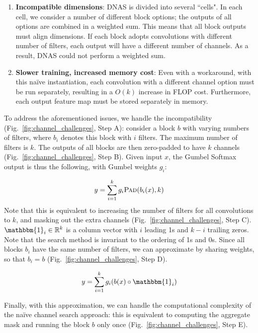 \documentclass[10pt,twocolumn,letterpaper]{article}
\begin{document}
\begin{enumerate}
    \item \textbf{Incompatible dimensions}: DNAS is divided into several ``cells". In each cell, we consider a number of different block options; the outputs of all options are combined in a weighted sum. This means that all block outputs must align dimensions. If each block adopts convolutions with different number of filters, each output will have a different number of channels. As a result, DNAS could not perform a weighted sum.
    \item \textbf{Slower training, increased memory cost}: Even with a workaround, with this naïve instantiation, each convolution with a different channel option must be run separately, resulting in a $O(k)$ increase in FLOP cost. Furthermore, each output feature map must be stored separately in memory.\end{enumerate}

To address the aforementioned issues, we handle the incompatibility (Fig.~\ref{fig:channel_challenges}, Step A): consider a block $b$ with varying numbers of filters, where $b_i$ denotes this block with $i$ filters. The maximum number of filters is $k$. The outputs of all blocks are then zero-padded to have $k$ channels (Fig.~\ref{fig:channel_challenges}, Step B). Given input $x$, the Gumbel Softmax output is thus the following, with Gumbel weights $g_i$:

\begin{equation}\label{eqn:channel-search-1}
    y = \sum_{i=1}^k g_i \textsc{Pad}(b_i(x), k)
\end{equation}
Note that this is equivalent to increasing the number of filters for all convolutions to $k$, and masking out the extra channels (Fig.~\ref{fig:channel_challenges}, Step C). $\mathbbm{1}_{i} \in \mathbb{R}^k$ is a column vector with $i$ leading 1s and $k-i$ trailing zeros. Note that the search method is invariant to the ordering of 1s and 0s. Since all blocks $b_i$ have the same number of filters, we can approximate by sharing weights, so that $b_i = b$ (Fig.~\ref{fig:channel_challenges}, Step D).

\begin{equation}\label{eqn:channel-search-2}
    y = \sum_{i=1}^k g_i (b(x) \circ \mathbbm{1}_{i})
\end{equation}

Finally, with this approximation, we can handle the computational complexity of the naïve channel search approach: this is equivalent to computing the aggregate mask and running the block $b$ only once (Fig.~\ref{fig:channel_challenges}, Step E).
\end{document}
